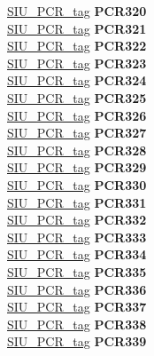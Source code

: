 \begin{DoxyCompactItemize}
\begin{tabbing}
\>\>\mbox{\hyperlink{unionSIU__tag_1_1SIU__PCR__tag}{SIU\_PCR\_tag}} {\bfseries PCR320}\\
\>\>\mbox{\hyperlink{unionSIU__tag_1_1SIU__PCR__tag}{SIU\_PCR\_tag}} {\bfseries PCR321}\\
\>\>\mbox{\hyperlink{unionSIU__tag_1_1SIU__PCR__tag}{SIU\_PCR\_tag}} {\bfseries PCR322}\\
\>\>\mbox{\hyperlink{unionSIU__tag_1_1SIU__PCR__tag}{SIU\_PCR\_tag}} {\bfseries PCR323}\\
\>\>\mbox{\hyperlink{unionSIU__tag_1_1SIU__PCR__tag}{SIU\_PCR\_tag}} {\bfseries PCR324}\\
\>\>\mbox{\hyperlink{unionSIU__tag_1_1SIU__PCR__tag}{SIU\_PCR\_tag}} {\bfseries PCR325}\\
\>\>\mbox{\hyperlink{unionSIU__tag_1_1SIU__PCR__tag}{SIU\_PCR\_tag}} {\bfseries PCR326}\\
\>\>\mbox{\hyperlink{unionSIU__tag_1_1SIU__PCR__tag}{SIU\_PCR\_tag}} {\bfseries PCR327}\\
\>\>\mbox{\hyperlink{unionSIU__tag_1_1SIU__PCR__tag}{SIU\_PCR\_tag}} {\bfseries PCR328}\\
\>\>\mbox{\hyperlink{unionSIU__tag_1_1SIU__PCR__tag}{SIU\_PCR\_tag}} {\bfseries PCR329}\\
\>\>\mbox{\hyperlink{unionSIU__tag_1_1SIU__PCR__tag}{SIU\_PCR\_tag}} {\bfseries PCR330}\\
\>\>\mbox{\hyperlink{unionSIU__tag_1_1SIU__PCR__tag}{SIU\_PCR\_tag}} {\bfseries PCR331}\\
\>\>\mbox{\hyperlink{unionSIU__tag_1_1SIU__PCR__tag}{SIU\_PCR\_tag}} {\bfseries PCR332}\\
\>\>\mbox{\hyperlink{unionSIU__tag_1_1SIU__PCR__tag}{SIU\_PCR\_tag}} {\bfseries PCR333}\\
\>\>\mbox{\hyperlink{unionSIU__tag_1_1SIU__PCR__tag}{SIU\_PCR\_tag}} {\bfseries PCR334}\\
\>\>\mbox{\hyperlink{unionSIU__tag_1_1SIU__PCR__tag}{SIU\_PCR\_tag}} {\bfseries PCR335}\\
\>\>\mbox{\hyperlink{unionSIU__tag_1_1SIU__PCR__tag}{SIU\_PCR\_tag}} {\bfseries PCR336}\\
\>\>\mbox{\hyperlink{unionSIU__tag_1_1SIU__PCR__tag}{SIU\_PCR\_tag}} {\bfseries PCR337}\\
\>\>\mbox{\hyperlink{unionSIU__tag_1_1SIU__PCR__tag}{SIU\_PCR\_tag}} {\bfseries PCR338}\\
\>\>\mbox{\hyperlink{unionSIU__tag_1_1SIU__PCR__tag}{SIU\_PCR\_tag}} {\bfseries PCR339}\\

\end{tabbing}
\end{DoxyCompactItemize}
